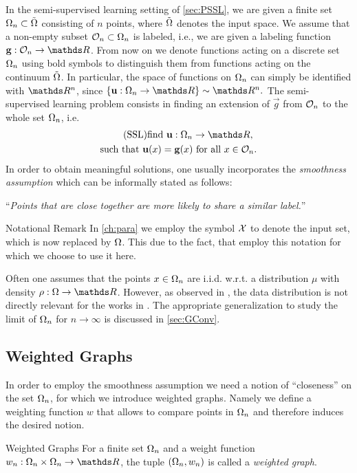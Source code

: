 In the semi-supervised learning setting of \cref{sec:PSSL}, we are given a finite set $\Omega_n\subset \tilde{\Omega}$ consisting of $n$ points, where $\tilde{\Omega}$ 
denotes the input space. We assume that a non-empty subset $\mathcal{O}_n \subset \Omega_n$ is labeled, i.e., we are given a labeling function
$\vec g:\conset_n\to\R$. From now on we denote functions acting on a discrete set $\Omega_n$ using bold symbols to distinguish them from functions acting on the continuum $\tilde{\Omega}$. In particular, the space of functions on $\Omega_n$ can simply be identified with $\R^n$, since $\{\vec u:\domain_n\to\R\} \sim \R^n.$
%
\noindent%
The semi-supervised learning problem consists in finding an extension of $\vec g$ from $\mathcal{O}_n$ to the whole set $\Omega_n$, i.e.
%
\begin{gather}\label{eq:SSL}
\begin{gathered}\tag{SSL}
\text{find } \vec u:\domain_n\to\R,\\
\text{such that } \vec u(x) = \vec g(x) \text{ for all } x\in\conset_n.
\end{gathered}
\end{gather}
%
%
%
%
In order to obtain meaningful solutions, one usually incorporates the \emph{smoothness assumption} \cite{subramanya2014graph} which can be informally stated as follows:
%
\begin{center}
\enquote{\textit{Points that are close together are more likely to share a similar label.}}
\end{center}
%
%

\begin{remark}{Notational Remark}{}
In \cref{ch:para} we employ the symbol $\mathcal{X}$ to denote the input set, which is now replaced by $\Omega$. This due to the fact, that \cite{roith2022continuum,bungert2021uniform, bungert2022ratio} employ this notation for which we choose to use it here.
\end{remark}
%
%
\noindent%
Often one assumes that the points $x\in\Omega_n$ are i.i.d. w.r.t. a distribution $\mu$ with density $\rho:\domain\to\R$. However, as observed in \cite{roith2022msc}, the data distribution is not directly relevant for the works in \cite{roith2022continuum, bungert2021uniform}. The appropriate generalization to study the limit of $\Omega_n$ for $n\to\infty$ is discussed in \cref{sec:GConv}.
%
%
\subsection{Weighted Graphs}
In order to employ the smoothness assumption we need a notion of \enquote{closeness} on the set $\Omega_n$, for which we introduce weighted graphs. Namely we define a weighting function $w$ that allows to compare points in $\Omega_n$ and therefore induces the desired notion. 
%
\begin{definition}{Weighted Graphs}{}
For a finite set $\Omega_n$ and a weight function $w_n:\domain_n\times \domain_n\to\R$, the tuple $(\Omega_n,w_n)$ is called a \emph{weighted graph}.
\end{definition}
%
%
